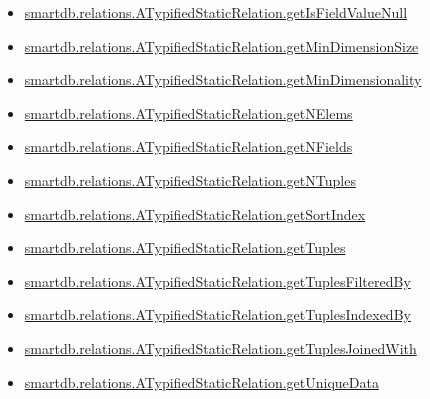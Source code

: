 \documentclass[letterpaper,10pt,english]{sphinxmanual}
\begin{document}
\begin{itemize}
\item {} 
{\hyperref[chap_functions:smartdb-relations-atypifiedstaticrelation-getisfieldvaluenull]{smartdb.relations.ATypifiedStaticRelation.getIsFieldValueNull}}

\item {} 
{\hyperref[chap_functions:smartdb-relations-atypifiedstaticrelation-getmindimensionsize]{smartdb.relations.ATypifiedStaticRelation.getMinDimensionSize}}

\item {} 
{\hyperref[chap_functions:smartdb-relations-atypifiedstaticrelation-getmindimensionality]{smartdb.relations.ATypifiedStaticRelation.getMinDimensionality}}

\item {} 
{\hyperref[chap_functions:smartdb-relations-atypifiedstaticrelation-getnelems]{smartdb.relations.ATypifiedStaticRelation.getNElems}}

\item {} 
{\hyperref[chap_functions:smartdb-relations-atypifiedstaticrelation-getnfields]{smartdb.relations.ATypifiedStaticRelation.getNFields}}

\item {} 
{\hyperref[chap_functions:smartdb-relations-atypifiedstaticrelation-getntuples]{smartdb.relations.ATypifiedStaticRelation.getNTuples}}

\item {} 
{\hyperref[chap_functions:smartdb-relations-atypifiedstaticrelation-getsortindex]{smartdb.relations.ATypifiedStaticRelation.getSortIndex}}

\item {} 
{\hyperref[chap_functions:smartdb-relations-atypifiedstaticrelation-gettuples]{smartdb.relations.ATypifiedStaticRelation.getTuples}}

\item {} 
{\hyperref[chap_functions:smartdb-relations-atypifiedstaticrelation-gettuplesfilteredby]{smartdb.relations.ATypifiedStaticRelation.getTuplesFilteredBy}}

\item {} 
{\hyperref[chap_functions:smartdb-relations-atypifiedstaticrelation-gettuplesindexedby]{smartdb.relations.ATypifiedStaticRelation.getTuplesIndexedBy}}

\item {} 
{\hyperref[chap_functions:smartdb-relations-atypifiedstaticrelation-gettuplesjoinedwith]{smartdb.relations.ATypifiedStaticRelation.getTuplesJoinedWith}}

\item {} 
{\hyperref[chap_functions:smartdb-relations-atypifiedstaticrelation-getuniquedata]{smartdb.relations.ATypifiedStaticRelation.getUniqueData}}


\end{itemize}
\end{document}
